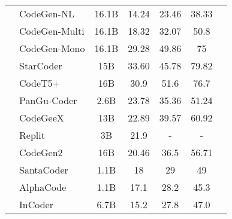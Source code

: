 \begin{table}[t]
{{\begin{tabular}{clccccc}
        & CodeGen-NL \cite{nijkamp2022codegen} & 16.1B & 14.24    & 23.46        & 38.33         & \\
        & CodeGen-Multi \cite{nijkamp2022codegen} & 16.1B & 18.32    & 32.07        & 50.8     & \\
        & CodeGen-Mono \cite{nijkamp2022codegen} & 16.1B & 29.28    & 49.86        & 75         & \\
        & StarCoder \cite{li2023starcoder} & 15B & 33.60   & 45.78    & 79.82     & \\
        & CodeT5+ \cite{wang2021codet5} & 16B & 30.9    & 51.6     & 76.7      & \\
        & PanGu-Coder \cite{christopoulou2022pangu} & 2.6B & 23.78   & 35.36    & 51.24     & \\
        & CodeGeeX \cite{zheng2023codegeex} & 13B & 22.89   & 39.57    & 60.92     & \\
        & Replit \cite{Replit} & 3B & 21.9    & -        & -         & \\
        & CodeGen2 \cite{nijkamp2023codegen2} & 16B & 20.46   & 36.5     & 56.71     & \\
         & SantaCoder \cite{allal2023santacoder} & 1.1B & 18        & 29      & 49& \\
         & AlphaCode \cite{li2022competition} & 1.1B & 17.1      & 28.2    & 45.3& \\
         & InCoder \cite{fried2022incoder} & 6.7B & 15.2      & 27.8    & 47.0& \\

\end{tabular}}}
\end{table}
